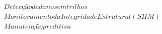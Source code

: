 \documentclass[preview]{standalone}
\begin{document}
\begin{align*}
Detecção de danos em trilhos\\Monitoramento da Integridade Estrutural (SHM)\\Manutenção preditiva\\
\end{align*}
\end{document}
